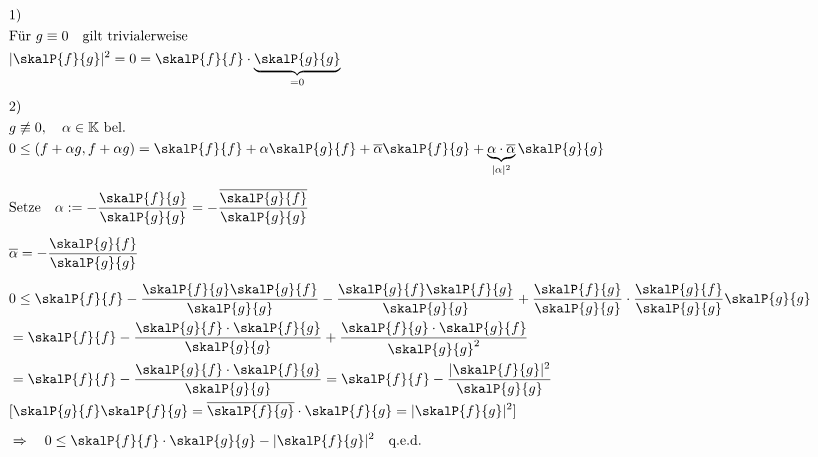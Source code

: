 \begin{beweisbox}
    $$
    \begin{aligned}
        &1) \\
         &\text{Für } g \equiv 0 \quad \text{gilt trivialerweise} \\
            &\lvert \skalP{f}{g} \rvert^{2} = 0 = \skalP{f}{f} \cdot \underbrace{\skalP{g}{g}}_{=0}\\[0.5em]
        &2) \\
         &g \not\equiv 0, \quad \alpha \in \mathbb{K}  \text{ bel.}\\
            &0 \le (f + \alpha g , f + \alpha g) = \skalP{f}{f} + \alpha \skalP{g}{f} + \overline{\alpha} \skalP{f}{g} + \underbrace{\alpha \cdot \overline{\alpha}}_{\lvert \alpha \rvert^{2}} \skalP{g}{g}\\[0.5em]
            &\text{Setze} \quad \alpha := - \frac{\skalP{f}{g}}{\skalP{g}{g}} = - \frac{\overline{\skalP{g}{f}}}{\skalP{g}{g}} \\[0.5em]
            &\overline{\alpha} = - \frac{\skalP{g}{f}}{\skalP{g}{g}} \\[0.5em]
            &0 \le \skalP{f}{f} - \frac{\skalP{f}{g}\skalP{g}{f}}{\skalP{g}{g}} - \frac{\skalP{g}{f}\skalP{f}{g}}{\skalP{g}{g}} + \frac{\skalP{f}{g}}{\skalP{g}{g}} \cdot \frac{\skalP{g}{f}}{\skalP{g}{g}}\skalP{g}{g} \\
            &= \skalP{f}{f} - \frac{\skalP{g}{f} \cdot \skalP{f}{g}}{\skalP{g}{g}} + \frac{\skalP{f}{g} \cdot \skalP{g}{f}}{\skalP{g}{g}^{2}}\\
            &= \skalP{f}{f} - \frac{\skalP{g}{f} \cdot \skalP{f}{g}}{\skalP{g}{g}} = \skalP{f}{f} - \frac{\lvert \skalP{f}{g} \rvert^{2}}{\skalP{g}{g}} \\
            &[\skalP{g}{f}\skalP{f}{g} = \overline{\skalP{f}{g}} \cdot \skalP{f}{g} = \lvert \skalP{f}{g} \rvert^{2}]\\[0.5em]
            &\Rightarrow \quad 0 \le \skalP{f}{f} \cdot \skalP{g}{g} - \lvert \skalP{f}{g} \rvert^{2} \quad \text{q.e.d.}\\
    \end{aligned}
    $$
\end{beweisbox}


